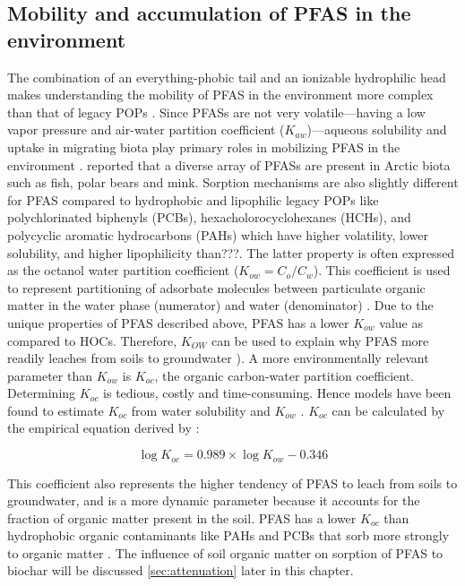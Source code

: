 \subsection{Mobility and accumulation of PFAS in the environment}
The combination of an everything-phobic tail and an ionizable hydrophilic head makes understanding the mobility of PFAS in the environment more complex than that of legacy POPs \citep{cabrerizo2018legacy,Arp2006}. Since PFASs are not very volatile---having a low vapor pressure and air-water partition coefficient ($K_{aw}$)---aqueous solubility and uptake in migrating biota play primary roles in mobilizing PFAS in the environment \citep{Arp2006}. \cite{Schlabach2017} reported that a diverse array of PFASs are present in Arctic biota such as fish, polar bears and mink. Sorption mechanisms are also slightly different for PFAS compared to hydrophobic and lipophilic legacy POPs like polychlorinated biphenyls (PCBs), hexacholorocyclohexanes (HCHs), and polycyclic aromatic hydrocarbons (PAHs) which have higher volatility, lower solubility, and higher lipophilicity than???\citep{cabrerizo2018legacy, Cornelissen2005,li2018}. The latter property is often expressed as the octanol water partition coefficient (\(K_{ow} = C_{o}/C_w\)). This coefficient is used to represent partitioning of adsorbate molecules between particulate organic matter in the water phase (numerator) and water (denominator) \citep{Reemtsma2016}. Due to the unique properties of PFAS described above, PFAS has a lower \(K_{ow}\) value as compared to HOCs. Therefore, \(K_{OW}\) can be used to explain why PFAS more readily leaches from soils to groundwater \citep{Cornelissen2005,du2014adsorption}). A more environmentally relevant parameter than \(K_{ow}\) is \(K_{oc}\), the organic carbon-water partition coefficient. Determining \(K_{oc}\) is tedious, costly and time-consuming. Hence models have been found to estimate \(K_{oc}\) from water solubility and \(K_{ow}\) \citep{pandey2021qspr}. \(K_{oc}\) can be calculated by the empirical equation derived by \citep{karickhoff1981semi}:

\begin{equation}
    \log K_{oc} = 0.989 \times \log K_{ow} - 0.346
\end{equation}

This coefficient also represents the higher tendency of PFAS to leach from soils to groundwater, and is a more dynamic parameter because it accounts for the fraction of organic matter present in the soil. PFAS has a lower \(K_{oc}\) than hydrophobic organic contaminants like PAHs and PCBs that sorb more strongly to organic matter \citep{Cornelissen2005}. The influence of soil organic matter on sorption of PFAS to biochar will be discussed \cref{sec:attenuation} later in this chapter.  

